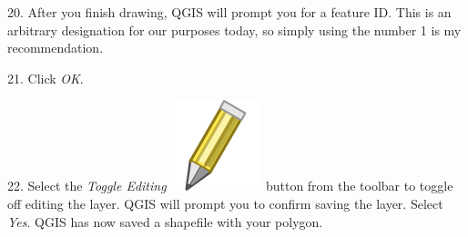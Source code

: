 \documentclass[oneside,a4paper,11pt,explicit]{book}
\begin{document}
	
	20. After you finish drawing, QGIS will prompt you for a feature ID. This is an arbitrary designation for our purposes today, so simply using the number 1 is my recommendation. 
	
	21. Click \textit{OK}. 
	
	22. Select the \textit{Toggle Editing} \includegraphics[height=\fontcharht\font`\B]{mActionToggleEditing.png} button from the toolbar to toggle off editing the layer. QGIS will prompt you to confirm saving the layer. Select \textit{Yes}. QGIS has now saved a shapefile with your polygon. 
	
	\vspace{.5em}
	
\end{document}

